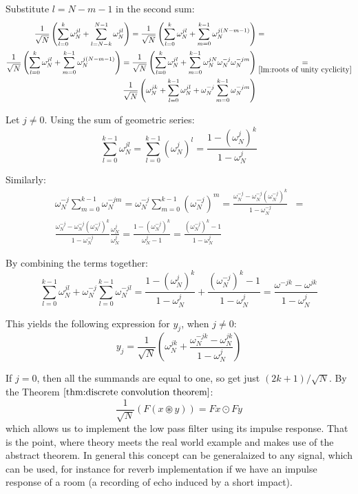 Substitute $l = N-m-1$ in the second sum:
\[\begin{aligned}
		\frac{1}{\sqrt{N}} \left(\sum_{l=0}^{k} \omega_N^{jl} + \sum_{l=N-k}^{N-1} \omega_N^{jl} \right) =
		\frac{1}{\sqrt{N}} \left(\sum_{l=0}^{k} \omega_N^{jl} + \sum_{m=0}^{k-1} \omega_N^{j(N-m-1)} \right)
		 & =                                               \\ \frac{1}{\sqrt{N}} \left(\sum_{l=0}^{k} \omega_N^{jl} + \sum_{m=0}^{k-1} \omega_N^{j(N-m-1)} \right)
		=\frac{1}{\sqrt{N}} \left(\sum_{l=0}^{k} \omega_N^{jl} + \sum_{m=0}^{k-1} \omega_N^{jN} \omega_N^{-j} \omega_N^{-jm} \right)
		 & \underset{\ref{lm:roots of unity cyclicity}}{=} \\ \frac{1}{\sqrt{N}} \left(\omega_N^{jk} + \sum_{l=0}^{k-1} \omega_N^{jl} + \omega_N^{-j} \sum_{m=0}^{k-1} \omega_N^{-jm} \right)
	\end{aligned}\]

Let $j\neq 0$. Using the sum of geometric series:
\[\sum_{l=0}^{k-1} \omega_N^{jl} = \sum_{l=0}^{k-1} {\left(\omega_N^{j}\right)}^l = \frac{1 - {\left(\omega_N^{j}\right)}^k}{1 - \omega_N^j}\]

Similarly:
\[\begin{aligned}
		\omega_N^{-j}\sum_{m=0}^{k-1} \omega_N^{-jm}
		= \omega_N^{-j}\sum_{m=0}^{k-1} {\left(\omega_N^{-j}\right)}^m
		= \frac{\omega_N^{-j} - \omega_N^{-j}{\left(\omega_N^{-j}\right)}^k}{1 - \omega_N^{-j}}
		 & = \\ \frac{\omega_N^{-j} - \omega_N^{-j}{\left(\omega_N^{-j}\right)}^k}{1 - \omega_N^{-j}} \frac{\omega_N^j}{\omega_N^j}
		= \frac{1 - {\left(\omega_N^{-j}\right)}^k}{\omega_N^{j} - 1}
		= \frac{{\left(\omega_N^{-j}\right)}^k - 1}{1 - \omega_N^{j}}
	\end{aligned}\]

By combining the terms together:
\[
	\sum_{l=0}^{k-1} \omega_N^{jl} + \omega_N^{-j} \sum_{l=0}^{k-1} \omega_N^{-jl}
	= \frac{1 - {\left(\omega_N^{j}\right)}^k}{1 - \omega_N^j} + \frac{{\left(\omega_N^{-j}\right)}^k - 1}{1 - \omega_N^{j}}
	= \frac{\omega^{-jk} - \omega^{jk}}{1 - \omega_N^{j}}\]

This yields the following expression for $y_j$, when $j\neq 0$:
\[y_{j}  = \frac{1}{\sqrt{N}} \left(\omega_N^{jk} + \frac{\omega_N^{-jk} - \omega_N^{jk}}{1 - \omega_N^{j}} \right)\]

If $j = 0$, then all the summands are equal to one, so get just $(2k+1)/\sqrt{N}$.
By the Theorem $\ref{thm:discrete convolution theorem}$:
\[\frac{1}{\sqrt N}(F(x\circledast y)) = Fx \odot Fy\]
which allows us to implement the low pass filter using its impulse response. That is the point, where theory meets the real world example and makes use of the abstract theorem. In general this concept can be generalaized to any signal, which can be used, for instance for reverb implementation if we have an impulse response of a room (a recording of echo induced by a short impact).

